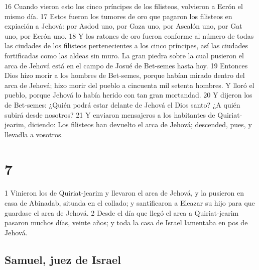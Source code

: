 16 Cuando vieron esto los cinco príncipes de los filisteos, volvieron a Ecrón el mismo día.
17 Estos fueron los tumores de oro que pagaron los filisteos en expiación a Jehová: por Asdod uno, por Gaza uno, por Ascalón uno, por Gat uno, por Ecrón uno.
18 Y los ratones de oro fueron conforme al número de todas las ciudades de los filisteos pertenecientes a los cinco príncipes, así las ciudades fortificadas como las aldeas sin muro. La gran piedra sobre la cual pusieron el arca de Jehová está en el campo de Josué de Bet-semes hasta hoy.
19 Entonces Dios hizo morir a los hombres de Bet-semes, porque habían mirado dentro del arca de Jehová; hizo morir del pueblo a cincuenta mil setenta hombres. Y lloró el pueblo, porque Jehová lo había herido con tan gran mortandad.
20 Y dijeron los de Bet-semes: ¿Quién podrá estar delante de Jehová el Dios santo? ¿A quién subirá desde nosotros?
21 Y enviaron mensajeros a los habitantes de Quiriat-jearim, diciendo: Los filisteos han devuelto el arca de Jehová; descended, pues, y llevadla a vosotros.

\chapter{7}


1 Vinieron los de Quiriat-jearim y llevaron el arca de Jehová, y la pusieron en casa de Abinadab, situada en el collado; y santificaron a Eleazar su hijo para que guardase el arca de Jehová. 
2 Desde el día que llegó el arca a Quiriat-jearim pasaron muchos días, veinte años; y toda la casa de Israel lamentaba en pos de Jehová.
\section*{Samuel, juez de Israel }

